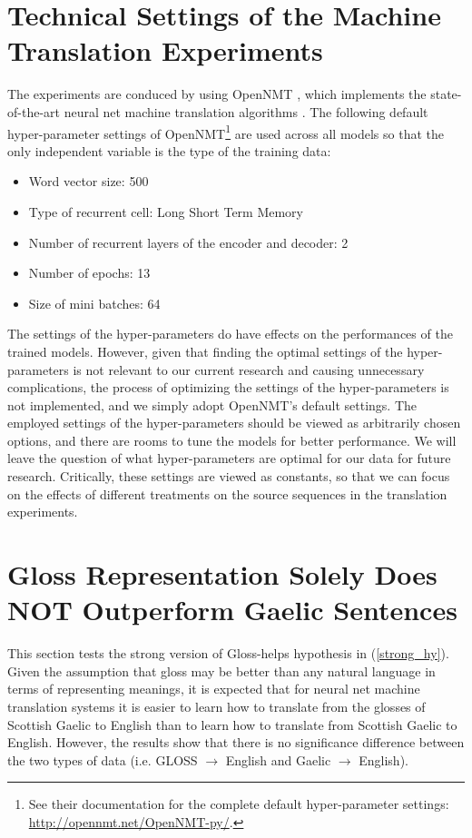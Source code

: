 \documentclass[a4paper]{article}
\begin{document}
\section{Technical Settings of the Machine Translation Experiments}\label{sec:experimet_setting}
The experiments are conduced by using OpenNMT \citep{2017opennmt}, which implements the state-of-the-art neural net machine translation algorithms \citep{cho2014properties, cho2014learning, bahdanau2014neural}.
The following default hyper-parameter settings of OpenNMT\footnote{See their documentation for the complete default hyper-parameter settings: \url{http://opennmt.net/OpenNMT-py/}.} are used across all models so that the only independent variable is the type of the training data:
	\begin{itemize}
	\item Word vector size: 500
	\item Type of recurrent cell: Long Short Term Memory
	\item Number of recurrent layers of the encoder and decoder: 2
	\item Number of epochs: 13
	\item Size of mini batches: 64\\
	\end{itemize}

The settings of the hyper-parameters do have effects on the performances of the trained models.
However, given that finding the optimal settings of the hyper-parameters is not relevant to our current research and causing unnecessary complications, the process of optimizing the settings of the hyper-parameters is not implemented, and we simply adopt OpenNMT's default settings. The employed settings of the hyper-parameters should be viewed as arbitrarily chosen options, and there are rooms to tune the models for better performance. We will leave the question of what hyper-parameters are optimal for our data for future research. Critically, these settings are viewed as constants, so that we can focus on the effects of different treatments on the source sequences in the translation experiments.

\section{Gloss Representation Solely Does NOT Outperform Gaelic Sentences} \label{gd_to_gl_to_en}
This section tests the strong version of Gloss-helps hypothesis in (\ref{strong_hy}).
Given the assumption that gloss may be better than any natural language in terms of representing meanings, it is expected that for neural net machine translation systems it is easier to learn how to translate from the glosses of Scottish Gaelic to English than to learn how to translate from Scottish Gaelic to English. However, the results show that there is no significance difference between the two types of data (i.e. GLOSS $\rightarrow$ English and Gaelic $\rightarrow$ English).
\end{document}
